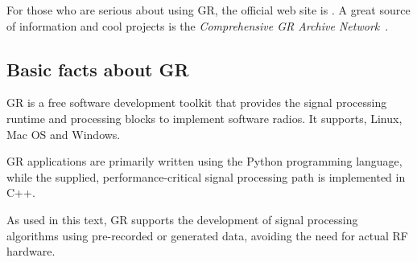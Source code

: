 For those who are serious about using GR, the official web site is . A great source of information and cool projects is the \emph{Comprehensive GR Archive Network}~. 

\subsection{Basic facts about GR}
GR is a free software development toolkit that provides the signal processing runtime and processing blocks to implement software radios.
It supports, Linux, Mac OS and Windows.

GR applications are primarily written using the Python programming language, while the supplied, performance-critical signal processing path is implemented in C++.

As used in this text, GR supports the development of signal processing algorithms using pre-recorded or generated data, avoiding the need for actual RF hardware.




